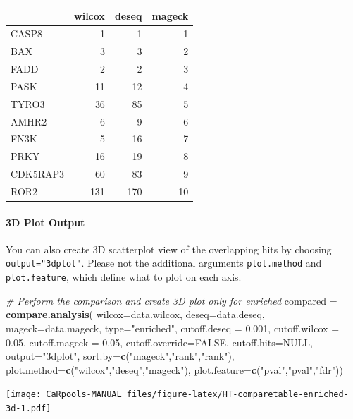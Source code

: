 \documentclass[]{article}
\newenvironment{Shaded}{\begin{snugshade}}{\end{snugshade}}
\newcommand{\KeywordTok}[1]{\textcolor[rgb]{0.13,0.29,0.53}{\textbf{{#1}}}}
\newcommand{\DataTypeTok}[1]{\textcolor[rgb]{0.13,0.29,0.53}{{#1}}}
\newcommand{\FloatTok}[1]{\textcolor[rgb]{0.00,0.00,0.81}{{#1}}}
\newcommand{\StringTok}[1]{\textcolor[rgb]{0.31,0.60,0.02}{{#1}}}
\newcommand{\CommentTok}[1]{\textcolor[rgb]{0.56,0.35,0.01}{\textit{{#1}}}}
\newcommand{\OtherTok}[1]{\textcolor[rgb]{0.56,0.35,0.01}{{#1}}}
\newcommand{\NormalTok}[1]{{#1}}
\let\oldparagraph\paragraph
\renewcommand{\paragraph}[1]{\oldparagraph{#1}\mbox{}}
\begin{document}
\begin{longtable}[c]{@{}lrrr@{}}
\toprule
& wilcox & deseq & mageck\tabularnewline
\midrule
\endhead
CASP8 & 1 & 1 & 1\tabularnewline
BAX & 3 & 3 & 2\tabularnewline
FADD & 2 & 2 & 3\tabularnewline
PASK & 11 & 12 & 4\tabularnewline
TYRO3 & 36 & 85 & 5\tabularnewline
AMHR2 & 6 & 9 & 6\tabularnewline
FN3K & 5 & 16 & 7\tabularnewline
PRKY & 16 & 19 & 8\tabularnewline
CDK5RAP3 & 60 & 83 & 9\tabularnewline
ROR2 & 131 & 170 & 10\tabularnewline
\bottomrule
\end{longtable}

\paragraph{3D Plot Output}\label{d-plot-output}

You can also create 3D scatterplot view of the overlapping hits by
choosing \texttt{output="3dplot"}. Please not the additional arguments
\texttt{plot.method} and \texttt{plot.feature}, which define what to
plot on each axis.

\begin{Shaded}
\begin{Highlighting}[]
\CommentTok{# Perform the comparison and create 3D plot only for enriched}
\NormalTok{compared =}\StringTok{ }\KeywordTok{compare.analysis}\NormalTok{( }\DataTypeTok{wilcox=}\NormalTok{data.wilcox, }\DataTypeTok{deseq=}\NormalTok{data.deseq, }\DataTypeTok{mageck=}\NormalTok{data.mageck, }\DataTypeTok{type=}\StringTok{"enriched"}\NormalTok{, }\DataTypeTok{cutoff.deseq =} \FloatTok{0.001}\NormalTok{, }\DataTypeTok{cutoff.wilcox =} \FloatTok{0.05}\NormalTok{, }\DataTypeTok{cutoff.mageck =} \FloatTok{0.05}\NormalTok{, }\DataTypeTok{cutoff.override=}\OtherTok{FALSE}\NormalTok{, }\DataTypeTok{cutoff.hits=}\OtherTok{NULL}\NormalTok{, }\DataTypeTok{output=}\StringTok{"3dplot"}\NormalTok{, }\DataTypeTok{sort.by=}\KeywordTok{c}\NormalTok{(}\StringTok{"mageck"}\NormalTok{,}\StringTok{"rank"}\NormalTok{,}\StringTok{"rank"}\NormalTok{), }\DataTypeTok{plot.method=}\KeywordTok{c}\NormalTok{(}\StringTok{"wilcox"}\NormalTok{,}\StringTok{"deseq"}\NormalTok{,}\StringTok{"mageck"}\NormalTok{), }\DataTypeTok{plot.feature=}\KeywordTok{c}\NormalTok{(}\StringTok{"pval"}\NormalTok{,}\StringTok{"pval"}\NormalTok{,}\StringTok{"fdr"}\NormalTok{))}
\end{Highlighting}
\end{Shaded}

\texttt{[image: CaRpools-MANUAL\_files/figure-latex/HT-comparetable-enriched-3d-1.pdf]}
\end{document}

